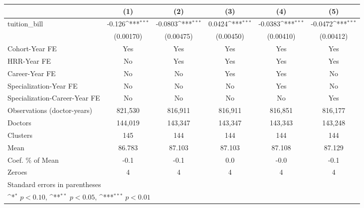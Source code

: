 {
\def\sym#1{\ifmmode^{#1}\else\(^{#1}\)\fi}
\begin{tabular}{l*{5}{c}}
\hline\hline
                    &\multicolumn{1}{c}{(1)}         &\multicolumn{1}{c}{(2)}         &\multicolumn{1}{c}{(3)}         &\multicolumn{1}{c}{(4)}         &\multicolumn{1}{c}{(5)}         \\
\hline
tuition\_bill        &      -0.126\sym{***}&     -0.0803\sym{***}&      0.0424\sym{***}&     -0.0383\sym{***}&     -0.0472\sym{***}\\
                    &   (0.00170)         &   (0.00475)         &   (0.00450)         &   (0.00410)         &   (0.00412)         \\
[1em]
Cohort-Year FE      &         Yes         &         Yes         &         Yes         &         Yes         &         Yes         \\
[1em]
HRR-Year FE         &          No         &         Yes         &         Yes         &         Yes         &         Yes         \\
[1em]
Career-Year FE      &          No         &          No         &         Yes         &         Yes         &          No         \\
[1em]
Specialization-Year FE&          No         &          No         &          No         &         Yes         &          No         \\
[1em]
Specialization-Career-Year FE&          No         &          No         &          No         &          No         &         Yes         \\
\hline
Observations (doctor-years)&     821,530         &     816,911         &     816,911         &     816,851         &     816,177         \\
Doctors             &     144,019         &     143,347         &     143,347         &     143,343         &     143,248         \\
Clusters            &         145         &         144         &         144         &         144         &         144         \\
Mean                &      86.783         &      87.103         &      87.103         &      87.108         &      87.129         \\
Coef. \% of Mean    &        -0.1         &        -0.1         &         0.0         &        -0.0         &        -0.1         \\
Zeroes              &           4         &           4         &           4         &           4         &           4         \\
\hline\hline
\multicolumn{6}{l}{\footnotesize Standard errors in parentheses}\\
\multicolumn{6}{l}{\footnotesize \sym{*} \(p<0.10\), \sym{**} \(p<0.05\), \sym{***} \(p<0.01\)}\\
\end{tabular}
}

